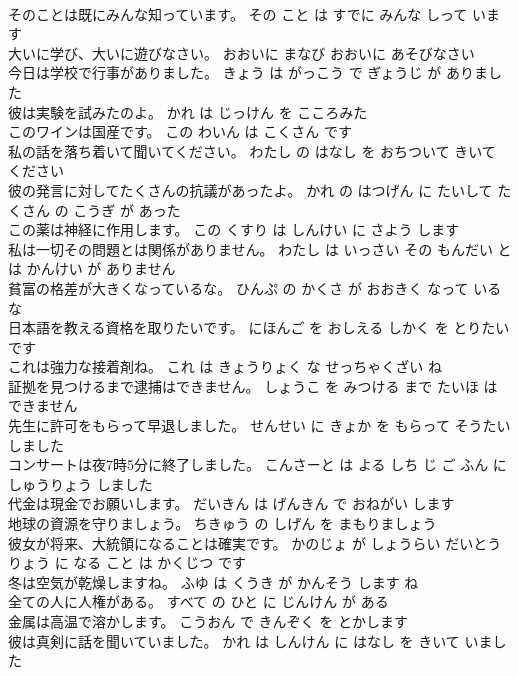 \documentclass[8pt]{extreport}
\begin{document}
\begin{CJK}{UTF8}{min}
\\	そのことは既にみんな知っています。	その こと は すでに みんな しって います 
\\	大いに学び、大いに遊びなさい。	おおいに まなび おおいに あそびなさい 
\\	今日は学校で行事がありました。	きょう は がっこう で ぎょうじ が ありました 
\\	彼は実験を試みたのよ。	かれ は じっけん を こころみた 
\\	このワインは国産です。	この わいん は こくさん です 
\\	私の話を落ち着いて聞いてください。	わたし の はなし を おちついて きいて ください 
\\	彼の発言に対してたくさんの抗議があったよ。	かれ の はつげん に たいして たくさん の こうぎ が あった 
\\	この薬は神経に作用します。	この くすり は しんけい に さよう します 
\\	私は一切その問題とは関係がありません。	わたし は いっさい その もんだい と は かんけい が ありません 
\\	貧富の格差が大きくなっているな。	ひんぷ の かくさ が おおきく なって いる な 
\\	日本語を教える資格を取りたいです。	にほんご を おしえる しかく を とりたい です 
\\	これは強力な接着剤ね。	これ は きょうりょく な せっちゃくざい ね 
\\	証拠を見つけるまで逮捕はできません。	しょうこ を みつける まで たいほ は できません 
\\	先生に許可をもらって早退しました。	せんせい に きょか を もらって そうたい しました 
\\	コンサートは夜7時5分に終了しました。	こんさーと は よる しち じ ご ふん に しゅうりょう しました 
\\	代金は現金でお願いします。	だいきん は げんきん で おねがい します 
\\	地球の資源を守りましょう。	ちきゅう の しげん を まもりましょう 
\\	彼女が将来、大統領になることは確実です。	かのじょ が しょうらい だいとうりょう に なる こと は かくじつ です 
\\	冬は空気が乾燥しますね。	ふゆ は くうき が かんそう します ね 
\\	全ての人に人権がある。	すべて の ひと に じんけん が ある 
\\	金属は高温で溶かします。	こうおん で きんぞく を とかします 
\\	彼は真剣に話を聞いていました。	かれ は しんけん に はなし を きいて いました 

\end{CJK}
\end{document}
